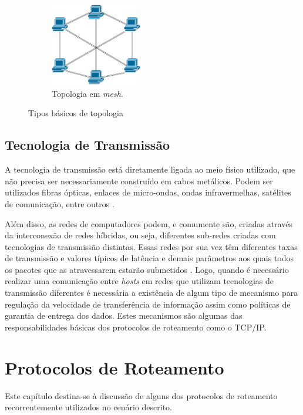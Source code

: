\begin{figure}[t!]
\begin{subfigure}[t]{0.4\textwidth}
	\end{subfigure}
	~
	\begin{subfigure}[t]{0.4\textwidth}
		\centering
		\includegraphics[width=4cm]{./figuras/Topologia-Mesh.pdf} %
	\caption{Topologia em \emph{mesh}.}
	\label{fig_topologia_multiplo_mesh}
	\end{subfigure}
	\caption{Tipos básicos de topologia}
	\label{fig_topologia_multiplo}
\end{figure}

\subsection{Tecnologia de Transmissão}
A tecnologia de transmissão está diretamente ligada ao meio físico utilizado, que não precisa ser necessariamente construído em cabos metálicos. Podem ser utilizados fibras ópticas, enlaces de micro-ondas, ondas infravermelhas, satélites de comunicação, entre outros \cite{Book-Tanenbaum2003}. 

Além disso, as redes de computadores podem, e comumente são, criadas através da interconexão de redes híbridas, ou seja, diferentes sub-redes criadas com tecnologias de transmissão distintas. Essas redes por sua vez têm diferentes taxas de transmissão e valores típicos de latência e demais parâmetros aos quais todos os pacotes que as atravessarem estarão submetidos \cite{Book-Kurose2013}. Logo, quando é necessário realizar uma comunicação entre \emph{hosts} em redes que utilizam tecnologias de transmissão diferentes é necessária a existência de algum tipo de mecanismo para regulação da velocidade de transferência de informação assim como políticas de garantia de entrega dos dados. Estes mecanismos são algumas das responsabilidades básicas dos protocolos de roteamento como o TCP/IP.

\section{Protocolos de Roteamento}
\label{cap_protocolos_de_roteamento}
Este capítulo destina-se à discussão de alguns dos protocolos de roteamento recorrentemente utilizados no cenário descrito.

